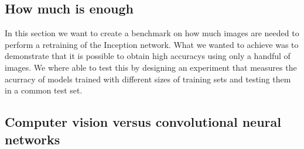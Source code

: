 \subsection{How much is enough}

In this section we want to create a benchmark on how much images are needed to perform a retraining of the Inception network. What we wanted to achieve was to demonstrate that it is possible to obtain high accuracys using only a handful of images. We where able to test this by designing an experiment that measures the acurracy of models trained with different sizes of training sets and testing them in a common test set. 

\subsection{Computer vision versus convolutional neural networks}

\begin{figure}[h]
  \begin{center}
  \end{center}
\end{figure}

